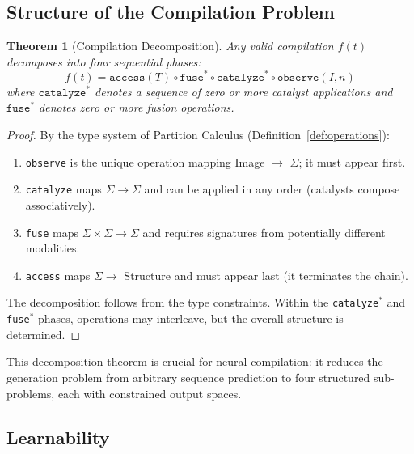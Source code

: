 \documentclass[11pt,twocolumn,a4paper]{article}
\newtheorem{theorem}{Theorem}[section]
\theoremstyle{definition}
\theoremstyle{remark}
\newcommand{\Sig}{\Sigma}
\begin{document}
\subsection{Structure of the Compilation Problem}

\begin{theorem}[Compilation Decomposition]
\label{thm:decomposition}
Any valid compilation $f(t)$ decomposes into four sequential phases:
\begin{equation}
f(t) = \texttt{access}(T) \circ \texttt{fuse}^* \circ \texttt{catalyze}^* \circ \texttt{observe}(I, n)
\end{equation}
where $\texttt{catalyze}^*$ denotes a sequence of zero or more catalyst applications and $\texttt{fuse}^*$ denotes zero or more fusion operations.
\end{theorem}

\begin{proof}
By the type system of Partition Calculus (Definition~\ref{def:operations}):
\begin{enumerate}
    \item \texttt{observe} is the unique operation mapping Image $\to$ $\Sig$; it must appear first.
    \item \texttt{catalyze} maps $\Sig \to \Sig$ and can be applied in any order (catalysts compose associatively).
    \item \texttt{fuse} maps $\Sig \times \Sig \to \Sig$ and requires signatures from potentially different modalities.
    \item \texttt{access} maps $\Sig \to$ Structure and must appear last (it terminates the chain).
\end{enumerate}
The decomposition follows from the type constraints. Within the \texttt{catalyze}$^*$ and \texttt{fuse}$^*$ phases, operations may interleave, but the overall structure is determined.
\end{proof}

This decomposition theorem is crucial for neural compilation: it reduces the generation problem from arbitrary sequence prediction to four structured sub-problems, each with constrained output spaces.

\subsection{Learnability}
\end{document}
